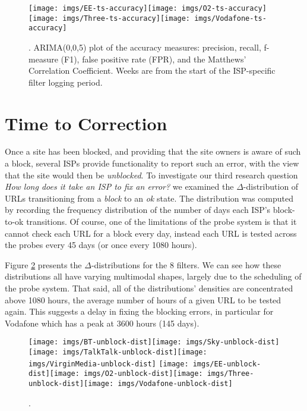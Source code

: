 \documentclass{bmcart}
\begin{document}
\begin{figure}[h!]
\caption{. ARIMA(0,0,5) plot of the accuracy measures: precision, recall, f-measure (F1), false positive rate (FPR), and the Matthews' Correlation Coefficient. Weeks are from the start of the ISP-specific filter logging period.}
\texttt{[image: imgs/EE-ts-accuracy]}\texttt{[image: imgs/O2-ts-accuracy]}
\texttt{[image: imgs/Three-ts-accuracy]}\texttt{[image: imgs/Vodafone-ts-accuracy]}
\label{fig:mobile-accuracy-ts}
\end{figure}
\clearpage






\section*{Time to Correction}
Once a site has been blocked, and providing that the site owners is aware of such a block, several ISPs provide functionality to report such an error, with the view that the site would then be \textit{unblocked}.
To investigate our third research question \textit{How long does it take an ISP to fix an error?} we examined the $\Delta$-distribution of URLs transitioning from a \textit{block} to an \textit{ok} state.
The distribution was computed by recording the frequency distribution of the number of days each ISP's block-to-ok transitions.
Of course, one of the limitations of the probe system is that it cannot check each URL for a block every day, instead each URL is tested across the probes every 45 days (or once every 1080 hours).

Figure \ref{fig:isps-unblock-dist} presents the $\Delta$-distributions for the 8 filters.
We can see how these distributions all have varying multimodal shapes, largely due to the scheduling of the probe system.
That said, all of the distributions' densities are concentrated above 1080 hours, the average number of hours of a given URL to be tested again.
This suggests a delay in fixing the blocking errors, in particular for Vodafone which has a peak at 3600 hours (145 days).

\begin{figure}[h!]
\caption{.}
\texttt{[image: imgs/BT-unblock-dist]}\texttt{[image: imgs/Sky-unblock-dist]}\texttt{[image: imgs/TalkTalk-unblock-dist]}\texttt{[image: imgs/VirginMedia-unblock-dist]}
\texttt{[image: imgs/EE-unblock-dist]}\texttt{[image: imgs/O2-unblock-dist]}\texttt{[image: imgs/Three-unblock-dist]}\texttt{[image: imgs/Vodafone-unblock-dist]}
\label{fig:isps-unblock-dist}
\end{figure}
\end{document}
